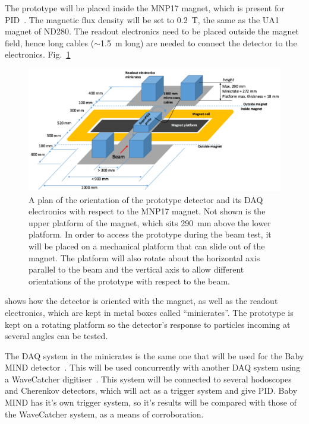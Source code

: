 \documentclass[aps,pra,12pt,notitlepage,tightenlines]{revtex4-1}
\begin{document}
The prototype will be placed inside the MNP17 magnet, which is present for PID~\cite{Brooks2015}. The magnetic flux density will be set to 0.2~T, the same as the UA1 magnet of ND280. The readout electronics need to be placed outside the magnet field, hence long cables ($\sim$1.5~m long) are needed to connect the detector to the electronics. Fig.\ \ref{fig:plat}
\begin{figure}
 \includegraphics[scale=0.8]{platform}
 \caption{A plan of the orientation of the prototype detector and its DAQ electronics with respect to the MNP17 magnet. Not shown is the upper platform of the magnet, which sits 290~mm above the lower platform. In order to access the prototype during the beam test, it will be placed on a mechanical platform that can slide out of the magnet. The platform will also rotate about the horizontal axis parallel to the beam and the vertical axis to allow different orientations of the prototype with respect to the beam.}
 \label{fig:plat}
\end{figure}
shows how the detector is oriented with the magnet, as well as the readout electronics, which are kept in metal boxes called ``minicrates''. The prototype is kept on a rotating platform so the detector's response to particles incoming at several angles can be tested.

The DAQ system in the minicrates is the same one that will be used for the Baby MIND detector~\cite{Antonova2017}. This will be used concurrently with another DAQ system using a WaveCatcher digitiser~\cite{CAEN}. This system will be connected to several hodoscopes and Cherenkov detectors, which will act as a trigger system and give PID. Baby MIND has it's own trigger system, so it's results will be compared with those of the WaveCatcher system, as a means of corroboration.
\end{document}
